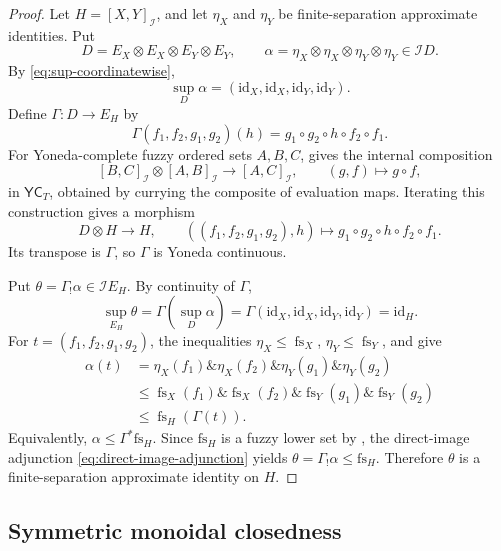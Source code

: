 \documentclass[preprint,3p,times]{elsarticle}
\theoremstyle{definition}
\theoremstyle{remark}
\newcommand{\I}{\mathcal{I}}
\newcommand{\YC}{\mathsf{YC}}
\newcommand{\fs}{\operatorname{fs}}
\newcommand{\tn}{\mathbin{\&}}
\numberwithin{equation}{section}
\begin{document}
\begin{proof}
Let $H=[X,Y]_{\mathcal I}$, and let $\eta_X$ and $\eta_Y$ be finite-separation approximate identities. Put
\[
D=E_X\otimes E_X\otimes E_Y\otimes E_Y,
\qquad
\alpha=\eta_X\otimes\eta_X\otimes\eta_Y\otimes\eta_Y
\in\mathcal I D.
\]
By \eqref{eq:sup-coordinatewise}, 
\[
\sup_D\alpha
=(\mathrm{id}_X,\mathrm{id}_X,\mathrm{id}_Y,\mathrm{id}_Y).
\]
Define $\Gamma:D\to E_H$ by
\[
\Gamma(f_1,f_2,g_1,g_2)(h)
=g_1\circ g_2\circ h\circ f_2\circ f_1.
\]
For Yoneda-complete fuzzy ordered sets \(A,B,C\),  gives the internal composition
\[
 [B,C]_{\I}\otimes[A,B]_{\I}\longrightarrow[A,C]_{\I},
 \qquad (g,f)\longmapsto g\circ f,
\]
in \(\YC_T\), obtained by currying the composite of evaluation maps. Iterating this construction gives a morphism
\[
 D\otimes H\longrightarrow H,\qquad
 ((f_1,f_2,g_1,g_2),h)
 \longmapsto g_1\circ g_2\circ h\circ f_2\circ f_1.
\]
Its transpose is \(\Gamma\), so \(\Gamma\) is Yoneda continuous.

Put $\theta=\Gamma_!\alpha\in\mathcal I E_H$. By continuity of $\Gamma$,
\[
    \sup_{E_H}\theta
    =\Gamma(\sup_D\alpha)
    =\Gamma(\mathrm{id}_X,\mathrm{id}_X,
             \mathrm{id}_Y,\mathrm{id}_Y)
    =\mathrm{id}_H.
\]
For \(t=(f_1,f_2,g_1,g_2)\), the inequalities \(\eta_X\leq\fs_X\), \(\eta_Y\leq\fs_Y\), and  give
\[
\begin{aligned}
 \alpha(t)
 &=\eta_X(f_1)\tn\eta_X(f_2)\tn
   \eta_Y(g_1)\tn\eta_Y(g_2)\\
 &\leq\fs_X(f_1)\tn\fs_X(f_2)\tn
       \fs_Y(g_1)\tn\fs_Y(g_2)\\
 &\leq\fs_H(\Gamma(t)).
\end{aligned}
\]
Equivalently,
\(
\alpha\le\Gamma^*\mathrm{fs}_H.
\)
Since $\mathrm{fs}_H$ is a fuzzy lower set by , the direct-image adjunction \eqref{eq:direct-image-adjunction} yields
\(
\theta=\Gamma_!\alpha\le\mathrm{fs}_H.
\)
Therefore $\theta$ is a finite-separation approximate identity on $H$.
\end{proof}

\subsection{Symmetric monoidal closedness}
\end{document}
